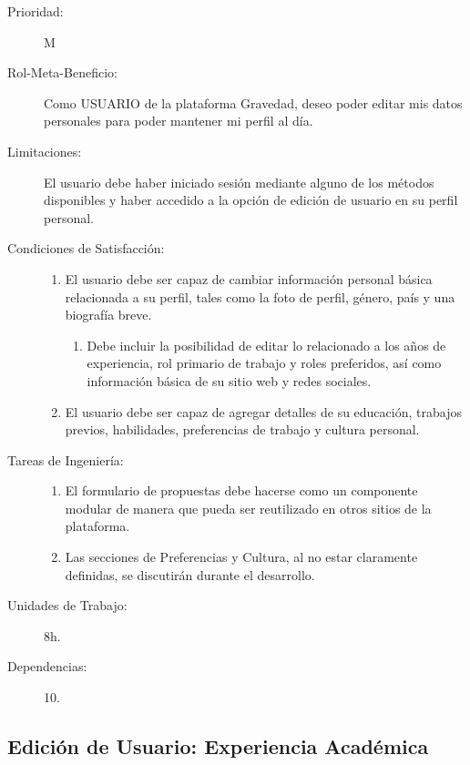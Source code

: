 \begin{description}
    \item[Prioridad:] M
    \item[Rol-Meta-Beneficio:] Como USUARIO de la plataforma Gravedad, deseo poder editar mis datos personales para poder mantener mi perfil al día.
    \item[Limitaciones:] El usuario debe haber iniciado sesión mediante alguno de los métodos disponibles y haber accedido a la opción de edición de usuario en su perfil personal.
    \item[Condiciones de Satisfacción:]  \hfill
        \begin{enumerate}
            \item El usuario debe ser capaz de cambiar información personal básica relacionada a su perfil, tales como la foto de perfil, género, país y una biografía breve.
    			\begin{enumerate}
    			    \item Debe incluir la posibilidad de editar lo relacionado a los años de experiencia, rol primario de trabajo y roles preferidos, así como información básica de su sitio web y redes sociales.
    			\end{enumerate}
    		\item El usuario debe ser capaz de agregar detalles de su educación, trabajos previos, habilidades, preferencias de trabajo y cultura personal.
        \end{enumerate}
    \item[Tareas de Ingeniería:]  \hfill
        \begin{enumerate}
            \item El formulario de propuestas debe hacerse como un componente modular de manera que pueda ser reutilizado en otros sitios de la plataforma.
		    \item Las secciones de Preferencias y Cultura, al no estar claramente definidas, se discutirán durante el desarrollo. 
		    \end{enumerate}
    \item[Unidades de Trabajo:] 8h.
    \item[Dependencias:] 10.
\end{description}

\newpage


\subsection{Edición de Usuario: Experiencia Académica}

